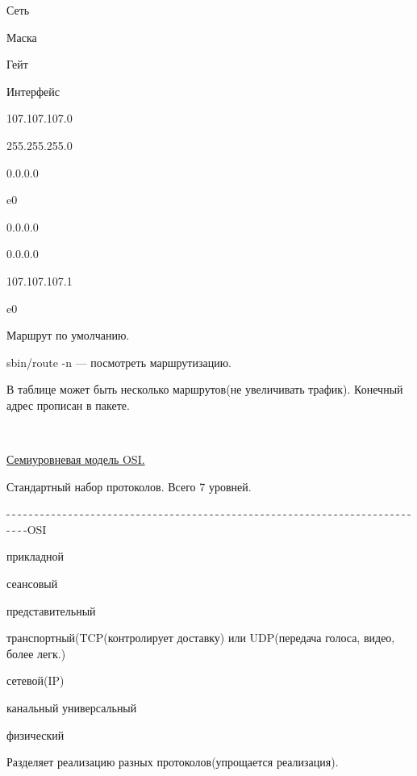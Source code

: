 	
	
	
	
	
		
			\par Сеть
		
		
			\par Маска
		
		
			\par Гейт
		
		
			\par Интерфейс
		
	
	
		
			\par 107.107.107.0
		
		
			\par 255.255.255.0
		
		
			\par 0.0.0.0
		
		
			\par e0
		
	
	
		
			\par 0.0.0.0
		
		
			\par 0.0.0.0
		
		
			\par 107.107.107.1
		
		
			\par e0
		
	

\par 
Маршрут
по умолчанию.
\par 
sbin/route -n — посмотреть маршрутизацию.
\par 
В таблице может быть несколько
маршрутов(не увеличивать трафик).
Конечный адрес прописан в пакете.
\par 
\\

\par 
\underline{Семиуровневая модель OSI.}
\par 
Стандартный набор протоколов.
Всего 7 уровней.
\par 
-$\,$-$\,$-$\,$-$\,$-$\,$-$\,$-$\,$-$\,$-$\,$-$\,$-$\,$-$\,$-$\,$-$\,$-$\,$-$\,$-$\,$-$\,$-$\,$-$\,$-$\,$-$\,$-$\,$-$\,$-$\,$-$\,$-$\,$-$\,$-$\,$-$\,$-$\,$-$\,$-$\,$-$\,$-$\,$-$\,$-$\,$-$\,$-$\,$-$\,$-$\,$-$\,$-$\,$-$\,$-$\,$-$\,$-$\,$-$\,$-$\,$-$\,$-$\,$-$\,$-$\,$-$\,$-$\,$-$\,$-$\,$-$\,$-$\,$-$\,$-$\,$-$\,$-$\,$-$\,$-$\,$-$\,$-$\,$-$\,$-$\,$-$\,$-$\,$-$\,$-$\,$-$\,$-$\,$-OSI
\par 
прикладной
\par 
сеансовый
\par 
представительный
\par 
транспортный(TCP(контролирует
доставку) или UDP(передача голоса, видео,
более легк.)
\par 
сетевой(IP)
\par канальный
    универсальный
\par 
физический
\par 
Разделяет реализацию разных
протоколов(упрощается реализация).
\par 
\\

